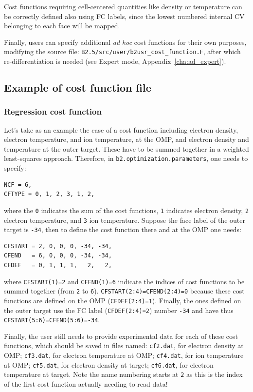 Cost functions requiring cell-centered quantities like density or temperature can be correctly defined also using FC labels, since the lowest numbered internal CV belonging to each face will be mapped.

Finally, users can specify additional {\it ad hoc} cost functions for their own purposes, modifying the source file: {\tt B2.5/src\allowbreak/user/b2usr\_cost\_function.F}, after which re-differentiation is needed (see Expert mode, Appendix~\ref{cha:ad_expert}).

\subsection{Example of cost function file}\label{sec:cfexample}

\subsubsection{Regression cost function}

Let's take as an example the case of a cost function including electron density, electron temperature, and ion temperature, at the OMP, and electron density and temperature at the outer target. These have to be summed together in a weighted least-squares approach. Therefore, in {\tt b2.optimization.parameters}, one needs to specify:
\begin{verbatim}
NCF = 6,
CFTYPE = 0, 1, 2, 3, 1, 2,
\end{verbatim}
where the {\tt 0} indicates the sum of the cost functions, {\tt 1} indicates electron density, {\tt 2} electron temperature, and {\tt 3} ion temperature. Suppose the face label of the outer target is {\tt -34}, then to define the cost function there and at the OMP one needs:
\begin{verbatim}
CFSTART = 2, 0, 0, 0, -34, -34,
CFEND   = 6, 0, 0, 0, -34, -34,
CFDEF   = 0, 1, 1, 1,   2,   2,
\end{verbatim}
where {\tt CFSTART(1)=2} and {\tt CFEND(1)=6} indicate the indices of cost functions to be summed together (from {\tt 2} to {\tt 6}). {\tt CFSTART(2:4)=CFEND(2:4)=0} because these cost functions are defined on the OMP ({\tt CFDEF(2:4)=1}). Finally, the ones defined on the outer target use the FC label ({\tt CFDEF(2:4)=2}) number {\tt -34} and have thus {\tt CFSTART(5:6)=\allowbreak CFEND(5:6)=-34}.

Finally, the user still needs to provide experimental data for each of these cost functions, which should be saved in files named: {\tt cf2.dat}, for electron density at OMP; {\tt cf3.dat}, for electron temperature at OMP; {\tt cf4.dat}, for ion temperature at OMP; {\tt cf5.dat}, for electron density at target; {\tt cf6.dat}, for electron temperature at target. Note the name numbering starts at {\tt 2} as this is the index of the first cost function actually needing to read data!

